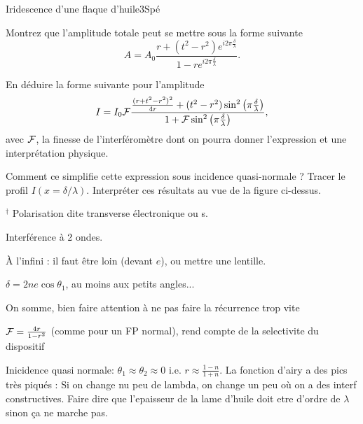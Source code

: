 \begin{exercise}{Iridescence d'une flaque d'huile}{3}{Spé}
\begin{questions}
\question Montrez que l'amplitude totale peut se mettre sous la forme suivante
$$A = A_0 \dfrac{r + (t^2-r^2) e^{i 2\pi\frac{\delta}{\lambda}}}{1 - r e^{i 2\pi\frac{\delta}{\lambda}}}.$$

\question En déduire la forme suivante pour l'amplitude
$$I = I_0\cal{F} \dfrac{\frac{(r+t^2-r^2)^2}{4r} + (t^2-r^2) \sin^2\qty(\pi\frac{\delta}{\lambda})}{1 + \cal{F} \sin^2\qty(\pi\frac{\delta}{\lambda})},$$
avec $\cal{F}$, la finesse de l'interféromètre dont on pourra donner l'expression et une interprétation physique.


\question Comment ce simplifie cette expression sous incidence quasi-normale ? Tracer le profil $I(x = \delta/\lambda)$. Interpréter ces résultats au vue de la figure ci-dessus.
\end{questions}

$^\dagger$ {\small Polarisation dite transverse électronique ou s.}
\end{exercise} 

\begin{solution}


\begin{questions}
\questioncours Interférence à 2 ondes.

\question À l'infini : il faut être loin (devant $e$), ou mettre une lentille.

\question $\delta = 2ne \cos\theta_1$, au moins aux petits angles...

\question On somme, bien faire attention à ne pas faire la récurrence trop vite

\question  $\cal{F} = \frac{4r}{1-r^2}$ (comme pour un FP normal), rend compte de la selectivite du dispositif


\question Inicidence quasi normale: $\theta_1\approx\theta_2\approx 0$ i.e. $r\approx \frac{1-n}{1+n}$. La fonction d'airy a des pics très piqués : Si on change nu peu de lambda, on change un peu où on a des interf constructives. Faire dire que l'epaisseur de la lame d'huile doit etre d'ordre de $\lambda$ sinon ça ne marche pas.
\end{questions}

\end{solution}